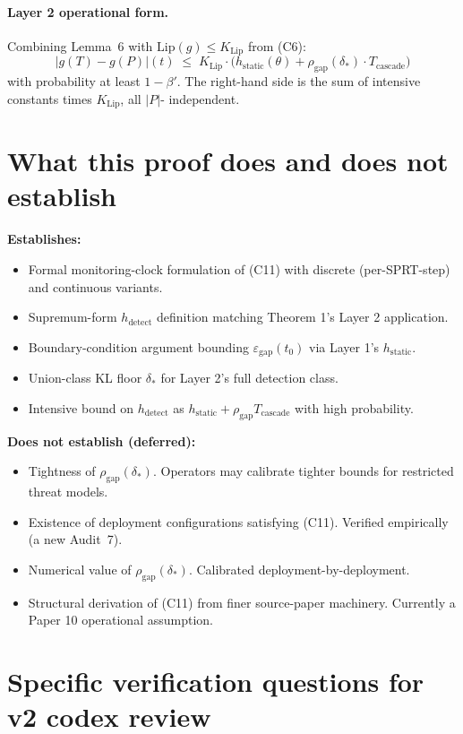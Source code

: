 \documentclass{article}
\newcommand{\deltastar}{\delta_{*}}
\newcommand{\rhogap}{\rho_{\mathrm{gap}}}
\newcommand{\Pproxy}{P}
\newcommand{\Ttruth}{T}
\newcommand{\epsgap}{\varepsilon_{\mathrm{gap}}}
\begin{document}
\paragraph{Layer 2 operational form.}
Combining Lemma~6 with $\mathrm{Lip}(g) \leq K_{\mathrm{Lip}}$ from
(C6):
\[
  |g(\Ttruth) - g(\Pproxy)|(t) \;\leq\; K_{\mathrm{Lip}} \cdot
  \bigl(h_{\mathrm{static}}(\theta) + \rhogap(\deltastar) \cdot
  T_{\mathrm{cascade}}\bigr)
\]
with probability at least $1 - \beta'$.  The right-hand side is the
sum of intensive constants times $K_{\mathrm{Lip}}$, all $|P|$-
independent.

\section{What this proof does and does not establish}

\textbf{Establishes:}
\begin{itemize}
\item Formal monitoring-clock formulation of (C11) with discrete
  (per-SPRT-step) and continuous variants.
\item Supremum-form $h_{\mathrm{detect}}$ definition matching
  Theorem 1's Layer 2 application.
\item Boundary-condition argument bounding $\epsgap(t_0)$ via
  Layer 1's $h_{\mathrm{static}}$.
\item Union-class KL floor $\deltastar$ for Layer 2's full
  detection class.
\item Intensive bound on $h_{\mathrm{detect}}$ as $h_{\mathrm{static}}
  + \rhogap T_{\mathrm{cascade}}$ with high probability.
\end{itemize}

\textbf{Does not establish (deferred):}
\begin{itemize}
\item Tightness of $\rhogap(\deltastar)$.  Operators may calibrate
  tighter bounds for restricted threat models.
\item Existence of deployment configurations satisfying (C11).
  Verified empirically (a new Audit~7).
\item Numerical value of $\rhogap(\deltastar)$.  Calibrated
  deployment-by-deployment.
\item Structural derivation of (C11) from finer source-paper
  machinery.  Currently a Paper 10 operational assumption.
\end{itemize}

\section{Specific verification questions for v2 codex review}
\end{document}
